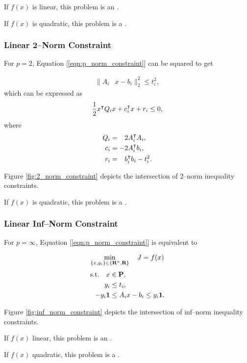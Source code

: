 \documentclass{article}
\begin{document}
    If $f(x)$ is linear, this problem is an \LP.

    If $f(x)$ is quadratic, this problem is a \QP.

\subsubsection{Linear 2--Norm Constraint}
    For $p=2$, Equation [\ref{eqn:p_norm_constraint}] can be squared to get

    \begin{align*}
        \|A_i&x-b_i\|_2^2\leq t_i^2,
    \end{align*}
    which can be expressed as
    \begin{align*}
        \frac{1}{2} x^\intercal Q_i x + c_i^\intercal x + r_i \leq 0,
    \end{align*}
    where
    \begin{align*}
        Q_i&=\minus 2A_i^\tp A_i,\\
        c_i&= -2A_i^\tp b_i,\\
        r_i&= \minus b_i^\tp b_i-t_i^2.
    \end{align*}

    Figure \ref{fig:2_norm_constraint} depicts the intersection of 
    2--norm inequality constraints.

    If $f(x)$ is quadratic, this problem is a \QCQP.
    
\subsubsection{Linear Inf--Norm Constraint}

    For $p=\infty$, Equation [\ref{eqn:p_norm_constraint}] is equivalent to

    \begin{align*}
        \min_{\{x,y_i\}\in\{\textbf{R}^n,\textbf{R}\}} \quad J =f(x)
    \end{align*}
    \begin{align*}
        \text{s.t.}\quad x&\in\textbf{P},\\
        y_i&\leq t_i,\\
        -y_i\textbf{1}&\leq A_ix-b_i\leq y_i\textbf{1}.
    \end{align*}

    Figure \ref{fig:inf_norm_constraint} depicts the intersection of 
    inf--norm inequality constraints.

    If $f(x)$ linear, this problem is an \LP.

    If $f(x)$ quadratic, this problem is a \QP.
\end{document}
